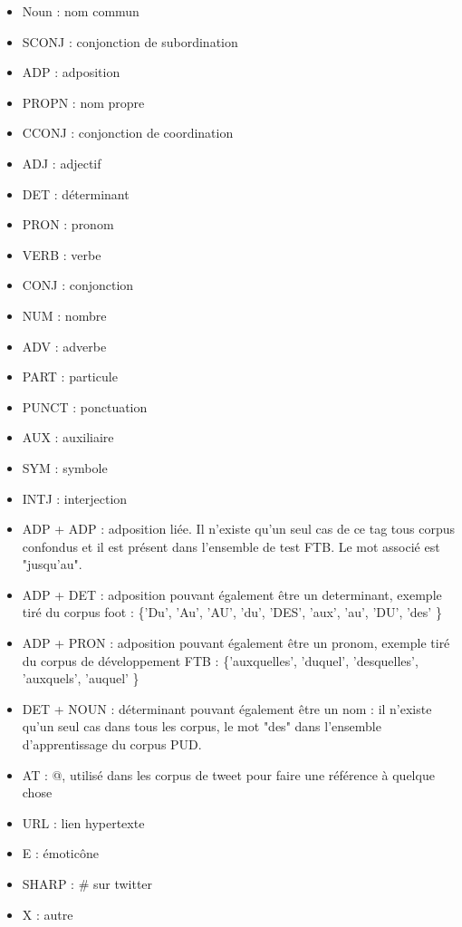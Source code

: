 \documentclass[french, 14pt]{memoir}
\begin{document}
\begin{itemize}
\item Noun : nom commun
\item SCONJ : conjonction de subordination
\item ADP : adposition
\item PROPN : nom propre
\item CCONJ : conjonction de coordination
\item ADJ : adjectif
\item DET : déterminant
\item PRON : pronom
\item VERB : verbe
\item CONJ : conjonction
\item NUM : nombre
\item ADV : adverbe
\item PART : particule
\item PUNCT : ponctuation
\item AUX : auxiliaire
\item SYM : symbole
\item INTJ : interjection
\item ADP + ADP : adposition liée. Il n'existe qu'un seul cas de ce tag tous corpus confondus et il est présent dans l'ensemble de test FTB. Le mot associé est "jusqu'au".
\item ADP + DET : adposition pouvant également être un determinant, exemple tiré du corpus foot : \{'Du', 'Au', 'AU', 'du', 'DES', 'aux', 'au', 'DU', 'des' \}
\item ADP + PRON : adposition pouvant également être un pronom, exemple tiré du corpus de développement FTB : \{'auxquelles', 'duquel', 'desquelles', 'auxquels', 'auquel' \}
\item DET + NOUN : déterminant pouvant également être un nom : il n'existe qu'un seul cas dans tous les corpus, le mot "des" dans l'ensemble d'apprentissage du corpus PUD.
\item AT : @, utilisé dans les corpus de tweet pour faire une référence à quelque chose
\item URL : lien hypertexte
\item E : émoticône
\item SHARP : \# sur twitter
\item X : autre
\end{itemize}
\end{document}
